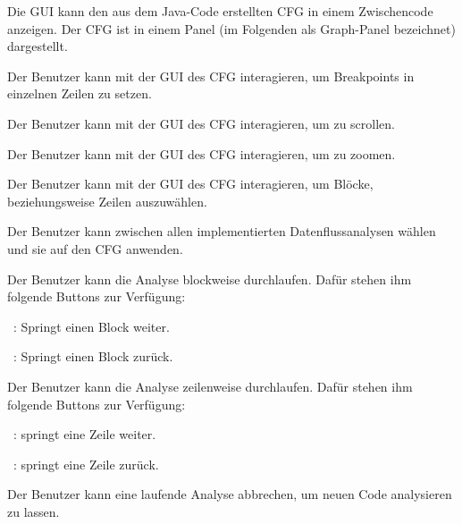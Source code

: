 Die GUI kann den aus dem Java-Code erstellten CFG in einem Zwischencode anzeigen. Der CFG ist in einem Panel (im Folgenden als Graph-Panel bezeichnet) dargestellt.

Der Benutzer kann mit der GUI des CFG interagieren, um Breakpoints in einzelnen Zeilen zu setzen.

Der Benutzer kann mit der GUI des CFG interagieren, um zu scrollen.

Der Benutzer kann mit der GUI des CFG interagieren, um zu zoomen.

Der Benutzer kann mit der GUI des CFG interagieren, um Blöcke, beziehungsweise Zeilen auszuwählen.

Der Benutzer kann zwischen allen implementierten Datenflussanalysen wählen und sie auf den CFG anwenden.

Der Benutzer kann die Analyse blockweise durchlaufen. Dafür stehen ihm folgende Buttons zur Verfügung:\par
\faFastForward\ : Springt einen Block weiter.\par
\faFastBackward\ : Springt einen Block zurück.

Der Benutzer kann die Analyse zeilenweise durchlaufen. Dafür stehen ihm folgende Buttons zur Verfügung:\par
\faStepForward\ : springt eine Zeile weiter.\par
\faStepBackward\ : springt eine Zeile zurück.

Der Benutzer kann eine laufende Analyse abbrechen, um neuen Code analysieren zu lassen.

